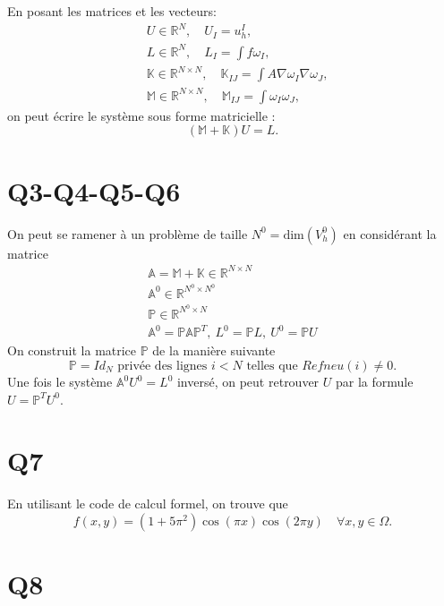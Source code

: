 \documentclass[11pt]{article}
\newcommand{\Am}{\mathbb{A}}
\renewcommand{\P}{\mathbb{P}}
\newcommand{\R}{\mathbb{R}}
\newcommand{\K}{\mathbb{K}}
\newcommand{\M}{\mathbb{M}}
\begin{document}
En posant les matrices et les vecteurs:
\begin{align}
  &U \in \R^{N}, \quad U_{I} = u_h^I, \\
  &L \in \R^{N}, \quad L_{I} = \int f \omega_I, \\
  &\K \in \R^{N\times N},\quad \K_{IJ} = \int A \nabla \omega_I \nabla \omega_J,  \\
  &\M \in \R^{N\times N},\quad \M_{IJ} = \int \omega_I \omega_J,
\end{align}
on peut écrire le système sous forme matricielle :
\begin{equation}
  (\M+\K) U = L.
\end{equation}


\section{Q3-Q4-Q5-Q6} 

On peut se ramener à un problème de taille $N^0 = \mbox{dim}(V^0_h)$ en considérant la matrice
\begin{gather}
  \Am = \M + \K \in \R^{N\times N } \\
  \Am^0 \in \R^{N^0\times N^0} \\
  \P \in \R^{N^0\times N} \\
  \Am^0 = \P\Am\P^T, ~ L^0 = \P L, ~ U^0 = \P U 
\end{gather} 
On construit la matrice $\P$ de la manière suivante
\begin{equation}
  \P = Id_N \mbox{~privée des lignes $i<N$ telles que $Refneu(i)\neq 0$.}
\end{equation}
Une fois le système $\Am^0 U^0 = L^0$ inversé, on peut retrouver $U$ par la formule $U=\P^T U^0$.

\section{Q7}

En utilisant le code de calcul formel, on trouve que
\begin{equation}
  f(x,y) = (1+5\pi^2)\cos(\pi x)\cos(2\pi y) \quad \forall x,y\in\Omega.
\end{equation}

\section{Q8}
\end{document}
